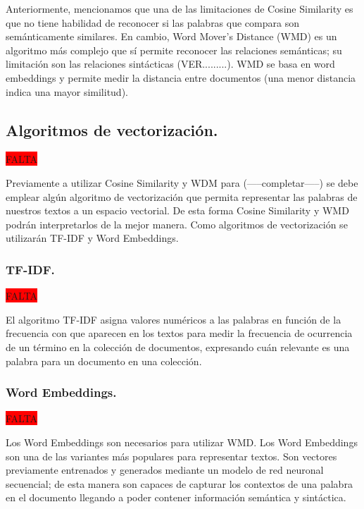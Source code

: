\documentclass[12pt,a4paper]{article}
\begin{document}
Anteriormente, mencionamos que una de las limitaciones de Cosine Similarity es que no tiene habilidad de reconocer si las palabras que compara son semánticamente similares. En cambio, Word Mover's Distance (WMD) es un algoritmo más complejo que sí permite reconocer las relaciones semánticas; su limitación son las relaciones sintácticas (VER.........). WMD se basa en word embeddings y permite medir la distancia entre documentos (una menor distancia indica una mayor similitud).

\cleardoublepage

\subsection{Algoritmos de vectorización.}
\colorbox{red}{FALTA}

Previamente a utilizar Cosine Similarity y WDM para (-----completar-----) se debe emplear algún algoritmo de vectorización que permita representar las palabras de nuestros textos a un espacio vectorial. De esta forma Cosine Similarity y WMD podrán interpretarlos de la mejor manera. 
Como algoritmos de vectorización se utilizarán TF-IDF y Word Embeddings.

\subsubsection{TF-IDF.}
\colorbox{red}{FALTA}

El algoritmo TF-IDF asigna valores numéricos a las palabras en función de la frecuencia con que aparecen en los textos para medir la frecuencia de ocurrencia de un término en la colección de documentos, expresando  cuán relevante es una palabra para un documento en una colección. 

\cleardoublepage

\subsubsection{Word Embeddings.}
\colorbox{red}{FALTA}

Los Word Embeddings son necesarios para utilizar WMD.
Los Word Embeddings son una de las variantes más populares para representar textos.  Son vectores previamente entrenados y generados mediante un modelo de red neuronal secuencial; de esta manera son capaces de capturar los contextos de una palabra en el documento llegando a poder contener información semántica y sintáctica. 

\cleardoublepage
\end{document}
